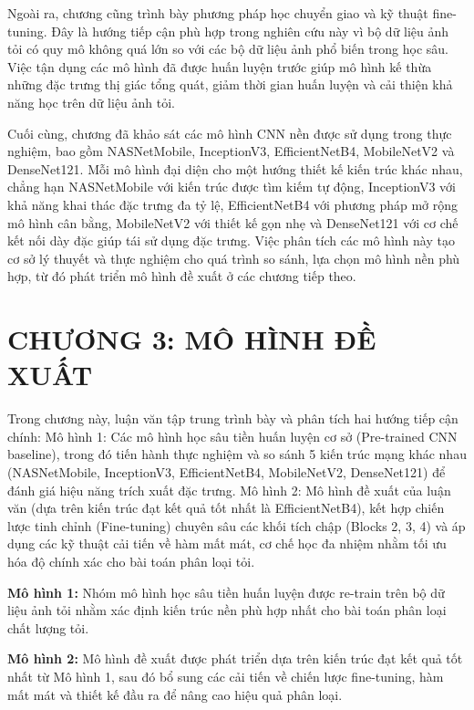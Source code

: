 \documentclass[
]{article}
\begin{document}
Ngoài ra, chương cũng trình bày phương pháp học chuyển giao và kỹ thuật
fine-tuning. Đây là hướng tiếp cận phù hợp trong nghiên cứu này vì bộ dữ
liệu ảnh tỏi có quy mô không quá lớn so với các bộ dữ liệu ảnh phổ biến
trong học sâu. Việc tận dụng các mô hình đã được huấn luyện trước giúp
mô hình kế thừa những đặc trưng thị giác tổng quát, giảm thời gian huấn
luyện và cải thiện khả năng học trên dữ liệu ảnh tỏi.

Cuối cùng, chương đã khảo sát các mô hình CNN nền được sử dụng trong
thực nghiệm, bao gồm NASNetMobile, InceptionV3, EfficientNetB4,
MobileNetV2 và DenseNet121. Mỗi mô hình đại diện cho một hướng thiết kế
kiến trúc khác nhau, chẳng hạn NASNetMobile với kiến trúc được tìm kiếm
tự động, InceptionV3 với khả năng khai thác đặc trưng đa tỷ lệ,
EfficientNetB4 với phương pháp mở rộng mô hình cân bằng, MobileNetV2 với
thiết kế gọn nhẹ và DenseNet121 với cơ chế kết nối dày đặc giúp tái sử
dụng đặc trưng. Việc phân tích các mô hình này tạo cơ sở lý thuyết và
thực nghiệm cho quá trình so sánh, lựa chọn mô hình nền phù hợp, từ đó
phát triển mô hình đề xuất ở các chương tiếp theo.

\section{CHƯƠNG 3: MÔ HÌNH ĐỀ
XUẤT}\label{chux1b0ux1a1ng-3-muxf4-huxecnh-ux111ux1ec1-xuux1ea5t}

Trong chương này, luận văn tập trung trình bày và phân tích hai hướng tiếp
cận chính: Mô hình 1: Các mô hình học sâu tiền huấn luyện cơ sở
(Pre-trained CNN baseline), trong đó tiến hành thực nghiệm và so sánh 5
kiến trúc mạng khác nhau (NASNetMobile, InceptionV3, EfficientNetB4,
MobileNetV2, DenseNet121) để đánh giá hiệu năng trích xuất đặc trưng. Mô
hình 2: Mô hình đề xuất của luận văn (dựa trên kiến trúc đạt kết quả tốt
nhất là EfficientNetB4), kết hợp chiến lược tinh chỉnh (Fine-tuning)
chuyên sâu các khối tích chập (Blocks 2, 3, 4) và áp dụng các kỹ thuật
cải tiến về hàm mất mát, cơ chế học đa nhiệm nhằm tối ưu hóa độ chính
xác cho bài toán phân loại tỏi.

\textbf{Mô hình 1:} Nhóm mô hình học sâu tiền huấn luyện được re-train
trên bộ dữ liệu ảnh tỏi nhằm xác định kiến trúc nền phù hợp nhất cho bài
toán phân loại chất lượng tỏi.

\textbf{Mô hình 2:} Mô hình đề xuất được phát triển dựa trên kiến trúc
đạt kết quả tốt nhất từ Mô hình 1, sau đó bổ sung các cải tiến về chiến
lược fine-tuning, hàm mất mát và thiết kế đầu ra để nâng cao hiệu quả
phân loại.
\end{document}
